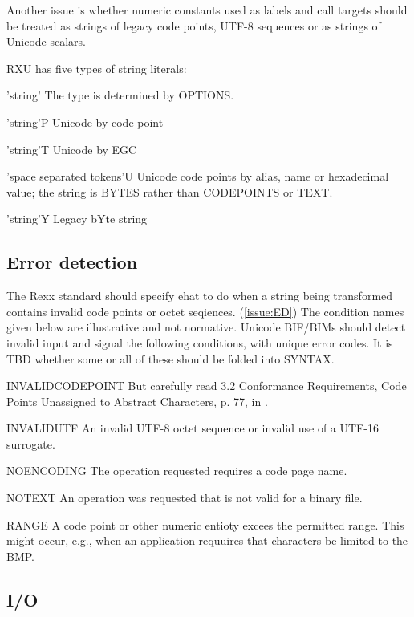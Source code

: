 \documentclass[b4paper]{article}
\begin{document}
Another issue is whether numeric constants used as labels and call
targets should be treated as strings of legacy code points, UTF-8
sequences or as strings of Unicode scalars.

RXU has five types of string literals:
\begin{definition}
\item['string'] The type is determined by OPTIONS.
\item['string'P] Unicode by code point
\item['string'T] Unicode by EGC
\item['space separated tokens'U]
Unicode code points by alias, name or hexadecimal value;
the string is BYTES rather than CODEPOINTS or TEXT.
\item['string'Y] Legacy bYte string
\end{definition}

\subsection{Error detection}
The Rexx standard should specify ehat to do when a string being transformed
contains invalid code points or octet seqiences. (\cref{issue:ED})
The condition names given below are illustrative and not normative.
Unicode BIF/BIMs should detect invalid input and signal the following conditions, with unique error codes.
It is TBD whether some or all of these should be folded into SYNTAX.

\begin{definition}
\item [INVALIDCODEPOINT]%
But carefully read 3.2 Conformance Requirements,
Code Points Unassigned to Abstract Characters, p. 77, in \cite{Unicode}.
\item[INVALIDUTF]%
An invalid UTF-8 octet sequence or invalid use of a UTF-16 surrogate.
\item [NOENCODING]%
The operation requested requires a code page name.
\item [NOTEXT]%
An operation was requested that is not valid for a binary file.
\item [RANGE]%
A code point or other numeric entioty excees the permitted range.
This might occur, e.g., when an application requuires that characters be limited to the BMP.
\end{definition}

\subsection{I/O}
\end{document}
